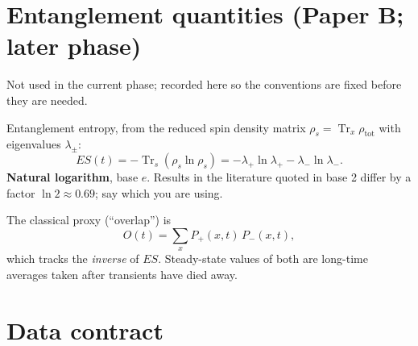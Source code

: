 \documentclass[11pt]{article}
\newcommand{\ES}{\mathit{ES}}
\newcommand{\Tr}{\operatorname{Tr}}
\begin{document}
\section{Entanglement quantities (Paper B; later phase)}
\label{sec:entanglement}

Not used in the current phase; recorded here so the conventions are fixed
before they are needed.

Entanglement entropy, from the reduced spin density matrix
$\rho_s = \Tr_x \rho_{\mathrm{tot}}$ with eigenvalues $\lambda_\pm$:
\begin{equation}
\ES(t) = -\Tr_{s}\!\left(\rho_s \ln \rho_s\right)
       = -\lambda_{+}\ln\lambda_{+} - \lambda_{-}\ln\lambda_{-}.
\label{eq:es}
\end{equation}
\textbf{Natural logarithm}, base $e$. Results in the literature quoted in
base 2 differ by a factor $\ln 2 \approx 0.69$; say which you are using.

The classical proxy (``overlap'') is
\begin{equation}
O(t) = \sum_{x} P_{+}(x,t)\, P_{-}(x,t),
\label{eq:overlap}
\end{equation}
which tracks the \emph{inverse} of $\ES$. Steady-state values of both are
long-time averages taken after transients have died away.

\section{Data contract}
\label{sec:data-contract}
\end{document}
